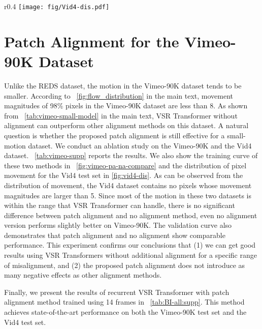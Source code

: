 \documentclass{article}
\begin{document}
\begin{wrapfigure}{r}{0.4\linewidth}
\vspace{-7mm}
\centering
\texttt{[image: fig/Vid4-dis.pdf]}
\vspace{-4mm}
\caption{The distribution of the movement for the Vid4 \cite{liu2013bayesian} test sets.}
\label{fig:vid4-dis}
\vspace{-3mm}
\end{wrapfigure}

\vspace{-3mm}
\section{Patch Alignment for the Vimeo-90K Dataset}
\vspace{-2mm}
Unlike the REDS \cite{nah2019ntire} dataset, the motion in the Vimeo-90K dataset \cite{xue2019video} tends to be smaller.
According to \figurename~\ref{fig:flow_distribution} in the main text, movement magnitudes of 98\% pixels in the Vimeo-90K dataset are less than 8.
As shown from \tablename~\ref{tab:vimeo-small-model} in the main text, VSR Transformer without alignment can outperform other alignment methods on this dataset.
A natural question is whether the proposed patch alignment is still effective for a small-motion dataset.
We conduct an ablation study on the Vimeo-90K and the Vid4 dataset.
\tablename~\ref{tab:vimeo-supp} reports the results.
We also show the training curve of these two methods in \figurename~\ref{fig:vimeo-pa-na-compare} and the distribution of pixel movement for the Vid4 \cite{liu2013bayesian} test set in \figurename\ref{fig:vid4-dis}.
As can be observed from the distribution of movement, the Vid4 dataset contains no pixels whose movement magnitudes are larger than 5.
Since most of the motion in these two datasets is within the range that VSR Transformer can handle, there is no significant difference between patch alignment and no alignment method, even no alignment version performs slightly better on Vimeo-90K.
The validation curve also demonstrates that patch alignment and no alignment show comparable performance.
This experiment confirms our conclusions that (1) we can get good results using VSR Transformers without additional alignment for a specific range of misalignment, and (2) the proposed patch alignment does not introduce as many negative effects as other alignment methods.


Finally, we present the results of recurrent VSR Transformer with patch alignment method trained using 14 frames in \tablename~\ref{tab:BI-all:supp}.
This method achieves state-of-the-art performance on both the Vimeo-90K test set and the Vid4 test set.
\end{document}
